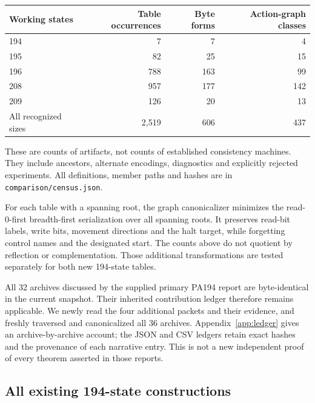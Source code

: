 \documentclass[11pt,letterpaper]{article}
\newcommand{\file}[1]{\texttt{\nolinkurl{#1}}}
\begin{document}
\begin{center}
\begin{tabular}{@{}lrrr@{}}
\toprule
Working states & Table occurrences & Byte forms & Action-graph classes\\
\midrule
194&7&7&4\\
195&82&25&15\\
196&788&163&99\\
208&957&177&142\\
209&126&20&13\\
\midrule
All recognized sizes&2,519&606&437\\
\bottomrule
\end{tabular}
\end{center}
These are counts of artifacts, not counts of established consistency
machines. They include ancestors, alternate encodings, diagnostics and
explicitly rejected experiments. All definitions, member paths and
hashes are in \file{comparison/census.json}.

For each table with a spanning root, the graph canonicalizer minimizes
the read-0-first breadth-first serialization over all spanning roots.
It preserves read-bit labels, write bits, movement directions and the
halt target, while forgetting control names and the designated start.
The counts above do not quotient by reflection or complementation.
Those additional transformations are tested separately for both new
194-state tables.

All 32 archives discussed by the supplied primary PA194 report are
byte-identical in the current snapshot. Their inherited contribution
ledger therefore remains applicable. We newly read the four additional
packets and their evidence, and freshly traversed and canonicalized all
36 archives. Appendix~\ref{app:ledger} gives an archive-by-archive
account; the JSON and CSV ledgers retain exact hashes and the provenance
of each narrative entry. This is not a new independent proof of every
theorem asserted in those reports.

\subsection{All existing 194-state constructions}
\end{document}
